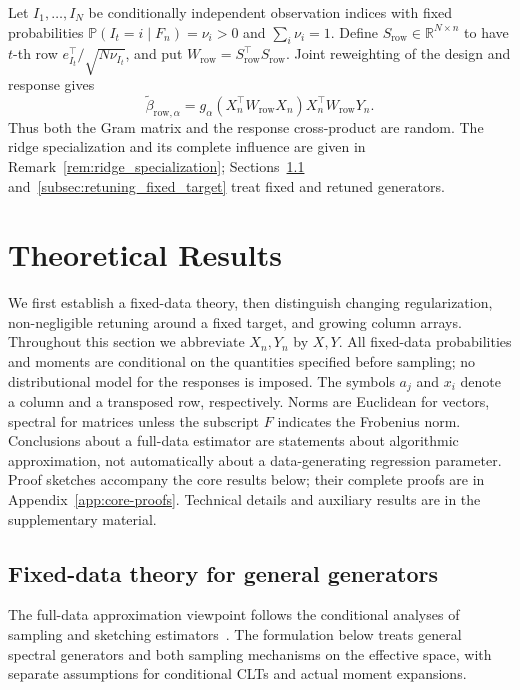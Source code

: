 \documentclass[pdflatex,iicol,sn-mathphys-ay]{sn-jnl}
\theoremstyle{thmstyleone}
\theoremstyle{thmstylethree}
\theoremstyle{thmstyletwo}
\newcommand{\RR}{\mathbb{R}}
\newcommand{\Prob}{\mathbb P}
\begin{document}
Let $I_1,\ldots,I_N$ be conditionally independent observation indices with
fixed probabilities $\Prob(I_t=i\mid F_n)=\nu_i>0$ and $\sum_i\nu_i=1$.
Define $S_{\mathrm{row}}\in\RR^{N\times n}$ to have $t$-th row
$e_{I_t}^\top/\sqrt{N\nu_{I_t}}$, and put
$W_{\mathrm{row}}=S_{\mathrm{row}}^\top S_{\mathrm{row}}$.
Joint reweighting of the design and response gives
\[
 \widetilde\beta_{\mathrm{row},\alpha}
 =g_\alpha(X_n^\top W_{\mathrm{row}}X_n)
       X_n^\top W_{\mathrm{row}}Y_n.
\]
Thus both the Gram matrix and the response cross-product are random.
The ridge specialization and its complete influence are given in
Remark~\ref{rem:ridge_specialization}; Sections~\ref{subsec:fixed_generator_theory}
and~\ref{subsec:retuning_fixed_target} treat fixed and retuned generators.

\section{Theoretical Results}\label{sec:theory}
We first establish a fixed-data theory, then distinguish changing
regularization, non-negligible retuning around a fixed target, and growing
column arrays. Throughout this section we abbreviate $X_n,Y_n$ by $X,Y$.
All fixed-data probabilities and moments are conditional on the quantities
specified before sampling; no distributional model for the responses is
imposed. The symbols $a_j$ and $x_i$ denote a column and a transposed row,
respectively. Norms are Euclidean for vectors, spectral for matrices unless
the subscript $F$ indicates the Frobenius norm. Conclusions about a full-data
estimator are statements about algorithmic approximation, not automatically
about a data-generating regression parameter.
Proof sketches accompany the core results below; their complete proofs are in
Appendix~\ref{app:core-proofs}. Technical details and auxiliary results are
in the supplementary material.

\subsection{Fixed-data theory for general generators}
\label{subsec:fixed_generator_theory}

The full-data approximation viewpoint follows the conditional analyses of
sampling and sketching estimators~\citep{ma2022asymptotic,ahfock2021statistical}.
The formulation below treats general spectral generators and both sampling
mechanisms on the effective space, with separate assumptions for conditional
CLTs and actual moment expansions.
\end{document}
